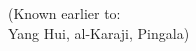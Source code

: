 \documentclass[preview]{standalone}
\begin{document}
\begin{center}
\footnotesize (Known earlier to:\\Yang Hui, al-Karaji, Pingala)
\end{center}
\end{document}
